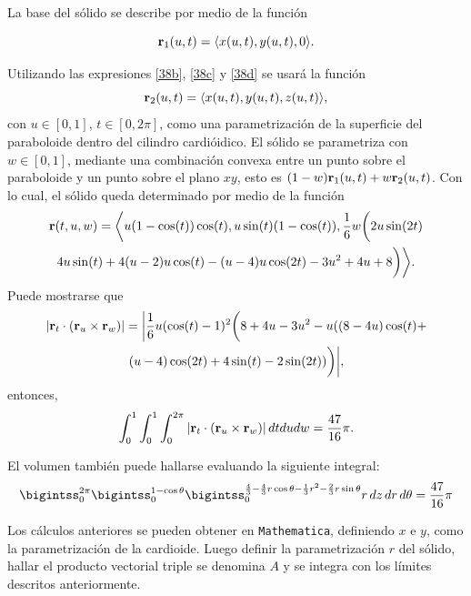 La base del sólido se describe por medio de la función

\[{\bf r}_1(u,t)=\langle x(u,t),y(u,t),0\rangle.\]

Utilizando las expresiones \ref{38b}, \ref{38c} y \ref{38d} se usará la función
%
\begin{equation}
{\bf r}_2(u,t)=\langle x(u,t),y(u,t),z(u,t)\rangle,
\end{equation}
%
con $u\in [0,1]$, $t\in [0,2\pi ]$, como una parametrización de la superficie del paraboloide dentro del cilindro cardióidico.
El sólido se parametriza con $w\in [0,1]$, mediante una combinación convexa entre un punto sobre el paraboloide y un punto sobre el plano $xy$, esto es $(1-w){\bf r}_1(u,t)+w{\bf r}_2(u,t)$.
Con lo cual, el sólido queda determinado por medio de la función
\begin{multline*}
{\bf r} (t,u,w) =\bigg\langle u(1-\cos(t))\cos(t),u\sin(t)(1-\cos(t)),\frac{1}{6}w\bigg(2u\sin(2t) \\
4u\sin(t)+4(u-2) u\cos(t)-(u-4)u\cos(2t)-3u^2+4u+8\bigg) \bigg\rangle.
\end{multline*}
Puede mostrarse que
\begin{multline*}
\left| {\bf r}_{t}\cdot \left( {\bf r}_{u}\times {\bf r}_{w}\right) \right|
=\bigg | \frac{1}{6}u(\cos(t)-1)^2\bigg(8+4u-3u^2-u((8-4u)\cos(t)+\\ (u-4)\cos(2t)+ 4\sin(t)-2\sin(2t))\bigg)\bigg |,
\end{multline*}
entonces,
\[\int_{0}^{1}\int_{0}^{1}\int_{0}^{2\pi}\left| {\bf r}_{t}\cdot \left( {\bf r}_{u}\times {\bf r}_{w}\right) \right|dtdudw= \frac{47}{16}\pi.\]

El volumen también puede hallarse evaluando la siguiente integral:
\[
\bigintss_{0}^{2\pi}
\bigintss_{0}^{1 - \cos \theta}
\bigintss_{0}^{\frac{4}{3} - \frac{4}{3}r\cos \theta - \frac{1}{3}r^{2} - \frac{2}{3}r\sin \theta}
r\, dz\, dr\, d\theta = \frac{47}{16}\pi
\]

Los cálculos anteriores se pueden obtener en \verb"Mathematica", definiendo $x$ e
$y$, como la parametrización de la cardioide. Luego definir la parametrización $r$ del sólido, hallar el producto vectorial triple se denomina $A$ y se integra con los límites descritos anteriormente.

